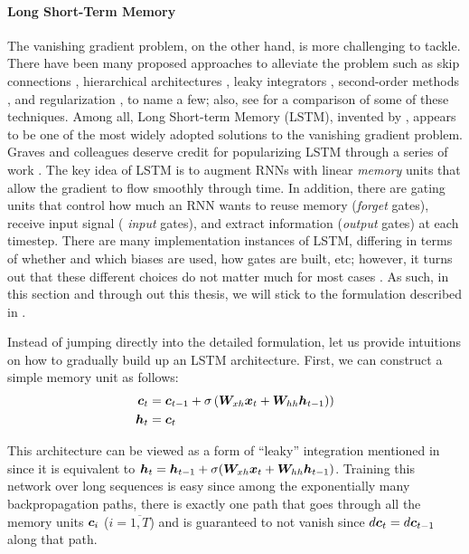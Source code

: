 \paragraph{Long Short-Term Memory}
The vanishing gradient problem, on the other hand, is more challenging to
tackle. There have been many proposed approaches to alleviate the problem such
as skip connections \cite{waibel90,lin96}, hierarchical
architectures \cite{el96}, leaky integrators \cite{Jaeger2007}, second-order
methods \cite{MartensS11}, and
regularization \cite{pascanu13}, to name a few; also, see \cite{bengio13} for a
comparison of some of these techniques. Among all, Long Short-term
Memory (LSTM), invented by , appears to be one of the most
widely adopted solutions to the vanishing gradient problem.
Graves and colleagues deserve credit for popularizing LSTM through a series of
work \cite{graves05,graves09,graves13c}. 
The key idea of LSTM
is to augment RNNs with linear {\it memory} units that allow the gradient to
flow smoothly through time. In addition, there are gating units that control how
much an RNN wants to reuse memory ({\it forget} gates), receive input signal ({\it
input} gates), and extract information ({\it output} gates) at each timestep.
There are many implementation instances of LSTM, differing in terms of
whether and which biases are used, how gates are built, etc; however, it turns
out that these different choices do not matter much for most cases
\cite{jozefowicz15,greff15}. As such, in this section and through out this
thesis, we will stick to the formulation described in \cite{zaremba14}.

Instead of jumping directly into the detailed formulation, let us provide intuitions
on how to gradually build up an LSTM architecture. First, we can construct a
simple memory unit as follows:
\begin{align}
\bm{c}_{t} &= \bm{c}_{t-1} + \sigma\left(\bm{W}_{xh}\bm{x}_{t} + \bm{W}_{hh}\bm{h}_{t-1}\right)
\label{e:simple_mem}) \\
\bm{h}_{t} &= \bm{c}_{t}
\end{align}

This architecture can be viewed as a form of ``leaky'' integration 
mentioned in \cite{sutskever12,bengio13} since it is equivalent to $\bm{h}_{t} =
\bm{h}_{t-1} + \sigma(\bm{W}_{xh}\bm{x}_{t} + \bm{W}_{hh}\bm{h}_{t-1})$. Training this
network over long sequences is easy since among the exponentially many backpropagation
paths, there is exactly one path that goes through all the memory units
$\bm{c}_{i}$ ($i=\overline{1,T}$) and is
guaranteed to not vanish since $d\bm{c}_{t} = d\bm{c}_{t-1}$ along that path. 

